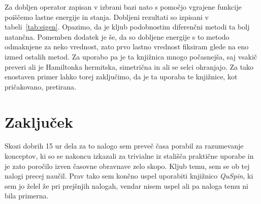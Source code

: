\documentclass{porocilo}
\begin{document}
Za dobljen operator zapisan v izbrani bazi nato s pomočjo vgrajene funkcije poiščemo lastne energije in stanja. Dobljeni rezultati so izpisani v tabeli~\ref{tab:eigen}. Opazimo, da je kljub podobnostim diferenčni metodi ta bolj natančna. Pomemben dodatek je še, da so dobljene energije s to metodo odmaknjene za neko vrednost, zato prvo lastno vrednost fiksiram glede na eno izmed ostalih metod. Za uporabo pa je ta knjižnica mnogo počasnejša, saj vsakič preveri ali je Hamiltonka hermitska, simetrična in ali se selci ohranjajo. Za tako enostaven primer lahko torej zaključimo, da je ta uporaba te knjižnice, kot pričakovano, pretirana.

\section{Zaključek}
Skozi dobrih 15 ur dela za to nalogo sem preveč časa porabil za razumevanje konceptov, ki so se nakoncu izkazali za trivialne iz stališča praktične uporabe in je zato poročilo izven časovne obravnave zelo skopo. Kljub temu, sem se ob tej nalogi precej naučil. Prav tako sem končno uspel uporabiti knjižnico \textit{QuSpin}, ki sem jo želel že pri prejšnjih nalogah, vendar nisem uspel ali pa naloga temu ni bila primerna.
\end{document}
